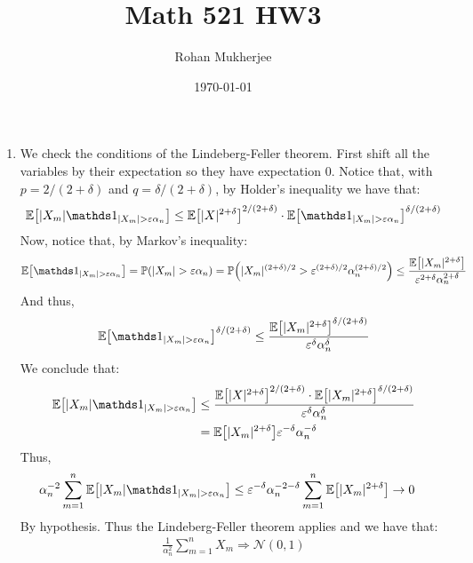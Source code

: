 \documentclass[12pt]{article}
\title{Math 521 HW3}
\date{\today}
\author{Rohan Mukherjee}
\theoremstyle{definitionstyle}
\def\ve{\varepsilon}
\newcommand{\1}{\mathds 1}
\renewcommand{\P}{\mathbb P \qty}
\newcommand{\E}{\mathbb E \qty}
\begin{document}
    \maketitle
    \begin{enumerate}
        \item We check the conditions of the Lindeberg-Feller theorem. First shift all the variables by their expectation so they have expectation 0. Notice that, with $p = 2/(2+\delta)$ and $q = \delta/(2+\delta)$, by Holder's inequality we have that:
        \begin{align*}
            \E[|X_m| \1_{|X_m| > \ve \alpha_n}] \leq \E[|X|^{2+\delta}]^{2/(2+\delta)} \cdot \E[\1_{|X_m| > \ve \alpha_n}]^{\delta/(2+\delta)}
        \end{align*}
        Now, notice that, by Markov's inequality:
        \begin{align*}
            \E[\1_{|X_m| > \ve \alpha_n}] = \P(|X_m| > \ve \alpha_n) = \P(|X_m|^{(2+\delta)/2} > \ve^{(2+\delta)/2} \alpha_n^{(2+\delta)/2}) \leq \frac{\E[|X_m|^{2+\delta}]}{\ve^{2+\delta} \alpha_n^{2+\delta}}
        \end{align*}
        And thus,
        \begin{align*}
            \E[\1_{|X_m| > \ve \alpha_n}]^{\delta/(2+\delta)} \leq \frac{\E[|X_m|^{2+\delta}]^{\delta/(2+\delta)}}{\ve^{\delta} \alpha_n^{\delta}}
        \end{align*}
        We conclude that:
        \begin{align*}
            \E[|X_m| \1_{|X_m| > \ve \alpha_n}] &\leq \frac{\E[|X|^{2+\delta}]^{2/(2+\delta)} \cdot \E[|X_m|^{2+\delta}]^{\delta/(2+\delta)}}{\ve^{\delta} \alpha_n^{\delta}} \\
            &= \E[|X_m|^{2+\delta}] \ve^{-\delta} \alpha_n^{-\delta}
        \end{align*}
        Thus,
        \begin{align*}
            \alpha_n^{-2} \sum_{m=1}^n \E[|X_m| \1_{|X_m| > \ve \alpha_n}] &\leq \ve^{-\delta} \alpha_n^{-2-\delta} \sum_{m=1}^n \E[|X_m|^{2+\delta}] \to 0
        \end{align*}
        By hypothesis. Thus the Lindeberg-Feller theorem applies and we have that:
        \begin{align*}
            \frac{1}{\alpha_n^2} \sum_{m=1}^n X_m \Rightarrow \mathcal N(0,1)
        \end{align*}


\end{enumerate}
\end{document}

